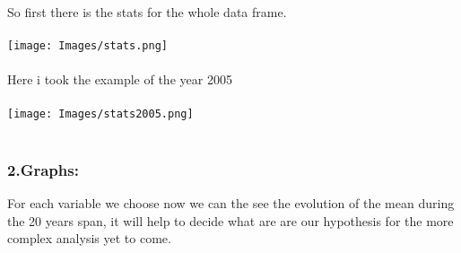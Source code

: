 \documentclass[
	12pt, %
]{fphw_assignment_toc}
\begin{document}
So first there is the stats for the whole data frame.
\\
\bigskip
\\
\texttt{[image: Images/stats.png]}
\\
\bigskip
\\
Here i took the example of the year 2005
\\
\bigskip
\\
\texttt{[image: Images/stats2005.png]}
\\
\bigskip
\\

\subsubsection{\large\bf 2.Graphs: }

For each variable we choose now we can the see the evolution of the mean during the 20 years span, it will help to decide what are are our hypothesis for the more complex analysis yet to come.
\end{document}
